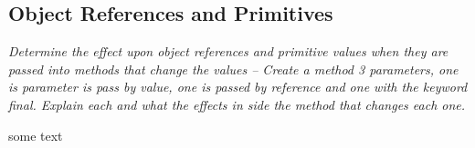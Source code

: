 \subsection{Object References and Primitives}
\textit{Determine the effect upon object references and primitive values when they are passed  into methods that change the values -- Create a method 3 parameters, one is parameter is pass by value, one is passed by reference and one with the keyword final.  Explain each and what the effects in side the method that changes each one.
}

some text

